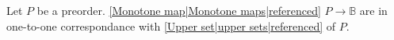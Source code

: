 

Let $P$ be a preorder. \ref{Monotone map|Monotone maps|referenced} $P \rightarrow \mathbb{B}$ are in one-to-one correspondance with \ref{Upper set|upper sets|referenced} of $P$.